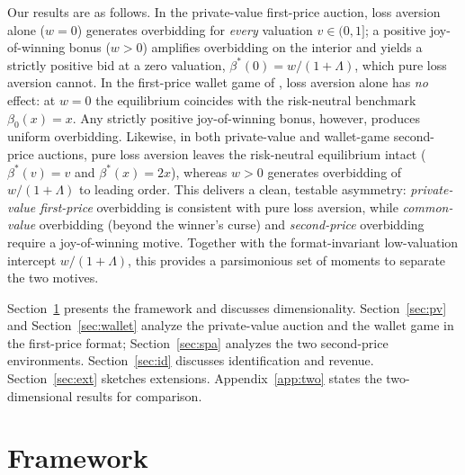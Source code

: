 \documentclass[11pt,a4paper]{article}
\theoremstyle{remark}
\begin{document}
Our results are as follows. In the private-value first-price auction, loss aversion
alone ($w=0$) generates overbidding for \emph{every} valuation $v\in(0,1]$; a
positive joy-of-winning bonus ($w>0$) amplifies overbidding on the interior and
yields a strictly positive bid at a zero valuation, $\beta^*(0)=w/(1+\Lambda)$,
which pure loss aversion cannot. In the first-price wallet game of
\citet{klemperer1998}, loss aversion alone has \emph{no} effect: at $w=0$ the
equilibrium coincides with the risk-neutral benchmark $\beta_0(x)=x$. Any strictly
positive joy-of-winning bonus, however, produces uniform overbidding. Likewise, in
both private-value and wallet-game second-price auctions, pure loss aversion leaves
the risk-neutral equilibrium intact ($\beta^*(v)=v$ and $\beta^*(x)=2x$), whereas
$w>0$ generates overbidding of $w/(1+\Lambda)$ to leading order. This delivers a
clean, testable asymmetry: \emph{private-value first-price} overbidding is
consistent with pure loss aversion, while \emph{common-value} overbidding (beyond
the winner's curse) and \emph{second-price} overbidding require a joy-of-winning
motive. Together with the format-invariant low-valuation intercept $w/(1+\Lambda)$,
this provides a parsimonious set of moments to separate the two motives.

Section~\ref{sec:framework} presents the framework and discusses dimensionality.
Section~\ref{sec:pv} and Section~\ref{sec:wallet} analyze the private-value auction
and the wallet game in the first-price format; Section~\ref{sec:spa} analyzes the
two second-price environments. Section~\ref{sec:id} discusses identification and
revenue. Section~\ref{sec:ext} sketches extensions. Appendix~\ref{app:two} states
the two-dimensional results for comparison.

\section{Framework}
\label{sec:framework}
\end{document}
